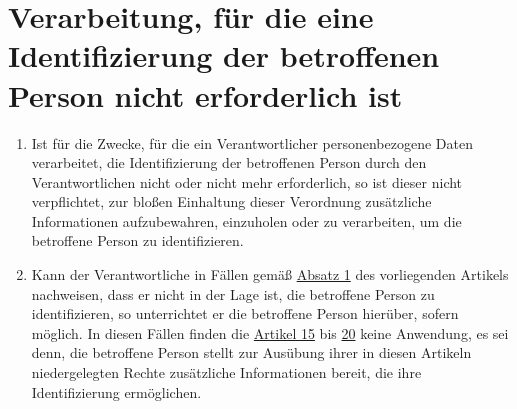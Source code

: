 \chapter{Verarbeitung, für die eine Identifizierung der betroffenen Person nicht erforderlich ist}
\label{ch:11}


\begin{enumerate}

  \item Ist für die Zwecke, für die ein Verantwortlicher personenbezogene Daten verarbeitet, die Identifizierung der
   betroffenen Person durch den Verantwortlichen nicht oder nicht mehr erforderlich, so ist dieser nicht verpflichtet,
   zur bloßen Einhaltung dieser Verordnung zusätzliche Informationen aufzubewahren, einzuholen oder zu verarbeiten, um
   die betroffene Person zu identifizieren.
  \label{itm:11-1}

  \item Kann der Verantwortliche in Fällen gemäß \hyperref[itm:11-1]{Absatz 1} des vorliegenden Artikels nachweisen,
   dass er nicht in der Lage ist, die betroffene Person zu identifizieren, so unterrichtet er die betroffene Person
   hierüber, sofern möglich. In diesen Fällen finden die \hyperref[ch:15]{Artikel 15} bis \hyperref[ch:20]{20} keine
   Anwendung, es sei denn, die betroffene Person stellt zur Ausübung ihrer in diesen Artikeln niedergelegten Rechte
   zusätzliche Informationen bereit, die ihre Identifizierung ermöglichen.
  \label{itm:11-2}

\end{enumerate}



